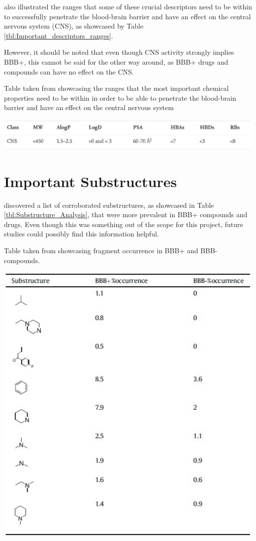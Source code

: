 \citet{Singh2020} also illustrated the ranges that some of these crucial descriptors need to be within to successfully penetrate the blood-brain barrier and have an effect on the central nervous system (CNS), as showcased by Table \ref{tbl:Important_descriptors_ranges}.

However, it should be noted that even though CNS activity strongly implies BBB+, this cannot be said for the other way around, as BBB+ drugs and compounds can have no effect on the CNS.

\begin{table}[!ht]
  \caption{Table taken from \citet{Singh2020} showcasing the ranges that the most important chemical properties need to be within in order to be able to penetrate the blood-brain barrier and have an effect on the central nervous system}
  \label{tbl:Important_descriptors_ranges}
  \includegraphics[width=1.0\linewidth]{images/Singh_Table1.pdf}
\end{table}

\section{Important Substructures}

\citet{Singh2020} discovered a list of corroborated substructures, as showcased in Table \ref{tbl:Substructure_Analysis}, that were more prevalent in BBB+ compounds and drugs. Even though this was something out of the scope for this project, future studies could possibly find this information helpful.

\begin{table}[!ht]
  \caption{Table taken from \citet{Singh2020} showcasing fragment occurrence in BBB+ and BBB- compounds.}
  \label{tbl:Substructure_Analysis}
  \includegraphics[width=0.45\linewidth]{images/Singh_Table13.pdf}
\end{table}

